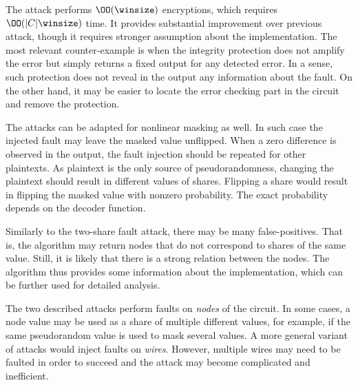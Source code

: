 The attack performs $\OO(\winsize)$ encryptions, which requires $\OO(|C|\winsize)$ time. It provides substantial improvement over previous attack, though it requires stronger assumption about the implementation. The most relevant counter-example is when the integrity protection does not amplify the error but simply returns a fixed output for any detected error. In a sense, such protection does not reveal in the output any information about the fault. On the other hand, it may be easier to locate the error checking part in the circuit and remove the protection.

The attacks can be adapted for nonlinear masking as well. In such case the injected fault may leave the masked value unflipped. When a zero difference is observed in the output, the fault injection should be repeated for other plaintexts. As plaintext is the only source of pseudorandomness, changing the plaintext should result in different values of shares. Flipping a share would result in flipping the masked value with nonzero probability. The exact probability depends on the decoder function.

Similarly to the two-share fault attack, there may be many false-positives. That is, the algorithm may return nodes that do not correspond to shares of the same value. Still, it is likely that there is a strong relation between the nodes. The algorithm thus provides some information about the implementation, which can be further used for detailed analysis.

\begin{remark}
The two described attacks perform faults on \emph{nodes} of the circuit. In some cases, a node value may be used as a share of multiple different values, for example, if the same pseudorandom value is used to mask several values. A more general variant of attacks would inject faults on \emph{wires}. However, multiple wires may need to be faulted in order to succeed and the attack may become complicated and inefficient.
\end{remark}